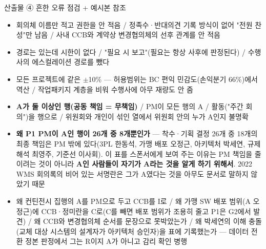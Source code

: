\begin{frame}[allowframebreaks=1.0]{산출물 ④ 흔한 오류 점검 + 예시본 참조}
\small
\par\smallskip{}\nobreak
\begin{itemize}
\item[$\square$]\relax 회의체 이름만 적고 권한을 안 적음 / 정족수·반대의견 기록 방식이 없어 "전원 찬성"만 남음 / 사내 CCB와 계약상 변경협의체의 선후 관계를 안 적음
\item[$\square$]\relax 경로는 있는데 시한이 없다 / "필요 시 보고"(필요는 항상 사후에 판정된다) / 수행사의 에스컬레이션 경로를 뺐다
\item[$\square$]\relax 모든 프로젝트에 같은 $\pm$10\% — 허용범위는 BC 편익 민감도(손익분기 66\%)에서 역산 / 작업패키지 계층을 비워 수행사에 아무 재량도 안 줌
\item[$\square$]\relax \textbf{A가 둘 이상인 행(공동 책임 = 무책임)} / PM이 모든 행의 A / 활동("주간 회의")을 행으로 / 위원회와 개인이 섞인 열에서 위원회 안의 누가 A인지 불명확
\end{itemize}
\par\smallskip{}\nobreak
\begin{itemize}
\item\relax \textbf{왜 P1 PM이 A인 행이 26개 중 8개뿐인가} — 착수·기획 결정 26개 중 18개의 최종 책임은 PM 밖에 있다(3PL 한동석, 가맹 배포 오정근, 아키텍처 박세연, 규제 해석 최영주, 기준선 이사회). 이 표를 스폰서에게 보여 주는 이유는 PM 책임을 줄이려는 것이 아니라 \textbf{A인 사람들이 자기가 A라는 것을 알게 하기 위해서}. 2022 WMS 회의록의 비어 있는 서명란은 그가 A였다는 것을 아무도 문서로 말하지 않았기 때문
\item\relax 왜 컨틴전시 집행의 A를 PM으로 두고 CCB를 I로 / 왜 가맹 SW 배포 범위(A 오정근)에 CCB·정미란을 C로(C를 빼면 배포 범위가 조용히 줄고 P1은 G2에서 발견) / 왜 CCB와 변경협의체 순서를 문장으로 못박았는가 / 왜 박세연의 이해 충돌(교체 대상 시스템의 설계자가 아키텍처 승인자)을 표에 기록했는가 — 데이터 전환 정본 판정에서 그는 R이지 A가 아니고 감리 확인 병행
\end{itemize}
\par\smallskip{}\nobreak
{}
\end{frame}

